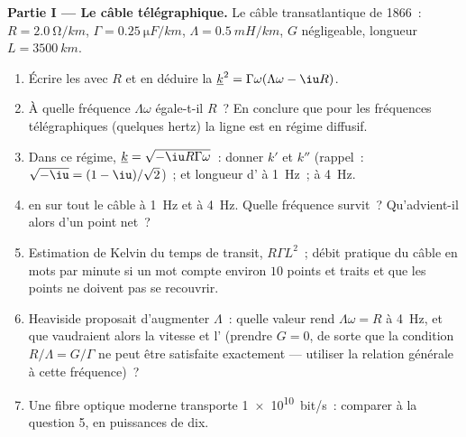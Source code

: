\begin{problem}
\label{pb:b2:dispersion-wave-packets:1}

\medskip
\noindent\textbf{Partie I --- Le câble télégraphique.}
Le câble transatlantique de 1866~: $R = \qty{2.0}{\ohm/km}$, $\Gamma = \qty{0.25}{\micro F/km}$,
$\Lambda = \qty{0.5}{mH/km}$, $G$ négligeable, longueur $L = \qty{3500}{km}$.
\begin{enumerate}
  \item Écrire les  avec $R$ et en déduire la
         $\underline k^2 = \Gamma\omega(\Lambda\omega - \iu R)$.
  \item À quelle fréquence $\Lambda\omega$ égale-t-il $R$~? En conclure que pour
        les fréquences télégraphiques (quelques hertz) la ligne est en
        régime diffusif.
  \item Dans ce régime, $\underline k = \sqrt{-\iu R\Gamma\omega}$~: donner $k'$ et $k''$
        (rappel~: $\sqrt{-\iu} = (1 - \iu)/\sqrt2$)~;  et
        longueur d' à \qty{1}{Hz}~; à \qty{4}{Hz}.
  \item {} en  sur tout le câble à \qty{1}{Hz} et
        à \qty{4}{Hz}. Quelle fréquence survit~? Qu'advient-il alors d'un
        point net~?
  \item Estimation de Kelvin du temps de transit, $R\Gamma L^2$~; débit pratique
        du câble en mots par minute si un mot compte environ
        $10$ points et traits et que les points ne doivent pas se recouvrir.
  \item Heaviside proposait d'augmenter $\Lambda$~: quelle valeur rend $\Lambda\omega = R$
        à \qty{4}{Hz}, et que vaudraient alors la vitesse et l'
        (prendre $G = 0$, de sorte que la condition $R/\Lambda = G/\Gamma$ ne peut être
        satisfaite exactement --- utiliser la relation générale à cette fréquence)~?
  \item Une fibre optique moderne transporte \qty{1e10}{bit/s}~: comparer à la
        question 5, en puissances de dix.
\end{enumerate}


\end{problem}

